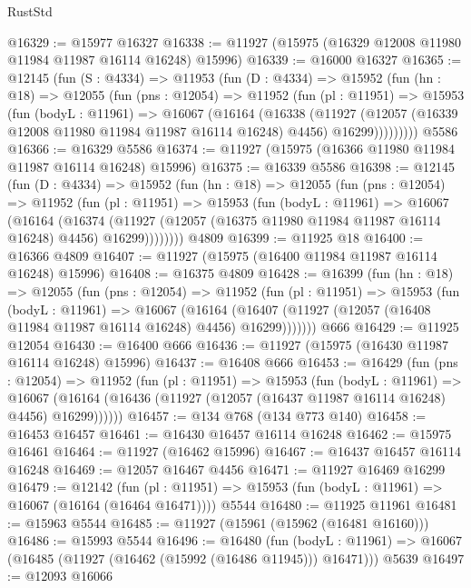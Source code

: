 \begin{lexlean}{RustStd}
\begin{coremodule}
@16329 := @15977 @16327
@16338 := @11927 (@15975 (@16329 @12008 @11980 @11984 @11987 @16114 @16248) @15996)
@16339 := @16000 @16327
@16365 := @12145
    (fun (S : @4334) =>
    @11953
      (fun (D : @4334) =>
      @15952
        (fun (hn : @18) =>
        @12055
          (fun (pns : @12054) =>
          @11952
            (fun (pl : @11951) =>
            @15953
              (fun (bodyL : @11961) =>
              @16067
                (@16164
                  (@16338
                    (@11927
                      (@12057 (@16339 @12008 @11980 @11984 @11987 @16114 @16248) @4456)
                      @16299)))))))))
    @5586
@16366 := @16329 @5586
@16374 := @11927 (@15975 (@16366 @11980 @11984 @11987 @16114 @16248) @15996)
@16375 := @16339 @5586
@16398 := @12145
    (fun (D : @4334) =>
    @15952
      (fun (hn : @18) =>
      @12055
        (fun (pns : @12054) =>
        @11952
          (fun (pl : @11951) =>
          @15953
            (fun (bodyL : @11961) =>
            @16067
              (@16164
                (@16374
                  (@11927 (@12057 (@16375 @11980 @11984 @11987 @16114 @16248) @4456) @16299))))))))
    @4809
@16399 := @11925 @18
@16400 := @16366 @4809
@16407 := @11927 (@15975 (@16400 @11984 @11987 @16114 @16248) @15996)
@16408 := @16375 @4809
@16428 := @16399
    (fun (hn : @18) =>
    @12055
      (fun (pns : @12054) =>
      @11952
        (fun (pl : @11951) =>
        @15953
          (fun (bodyL : @11961) =>
          @16067
            (@16164
              (@16407 (@11927 (@12057 (@16408 @11984 @11987 @16114 @16248) @4456) @16299)))))))
    @666
@16429 := @11925 @12054
@16430 := @16400 @666
@16436 := @11927 (@15975 (@16430 @11987 @16114 @16248) @15996)
@16437 := @16408 @666
@16453 := @16429
    (fun (pns : @12054) =>
    @11952
      (fun (pl : @11951) =>
      @15953
        (fun (bodyL : @11961) =>
        @16067 (@16164 (@16436 (@11927 (@12057 (@16437 @11987 @16114 @16248) @4456) @16299))))))
@16457 := @134 @768 (@134 @773 @140)
@16458 := @16453 @16457
@16461 := @16430 @16457 @16114 @16248
@16462 := @15975 @16461
@16464 := @11927 (@16462 @15996)
@16467 := @16437 @16457 @16114 @16248
@16469 := @12057 @16467 @4456
@16471 := @11927 @16469 @16299
@16479 := @12142
    (fun (pl : @11951) => @15953 (fun (bodyL : @11961) => @16067 (@16164 (@16464 @16471))))
    @5544
@16480 := @11925 @11961
@16481 := @15963 @5544
@16485 := @11927 (@15961 (@15962 (@16481 @16160)))
@16486 := @15993 @5544
@16496 := @16480
    (fun (bodyL : @11961) => @16067 (@16485 (@11927 (@16462 (@15992 (@16486 @11945))) @16471)))
    @5639
@16497 := @12093 @16066

\end{coremodule}
\end{lexlean}
